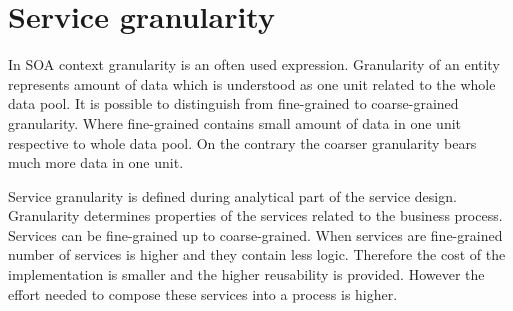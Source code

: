


\bigskip



\section{Service granularity}
\label{sec:granularity}
In SOA context granularity is an often used expression. Granularity of an entity represents amount of data which is understood as one unit related to the whole data pool. It is possible to distinguish from fine-grained to coarse-grained granularity. Where fine-grained contains small amount of data in one unit respective to whole data pool. On the contrary the coarser granularity bears much more data in one unit.

Service granularity is defined during analytical part of the service design. Granularity determines properties of the services related to the business process. Services can be fine-grained up to coarse-grained. When services are fine-grained number of services is higher and they contain less logic. Therefore the cost of the implementation is smaller and the higher reusability is provided. However the effort needed to compose these services into a process is higher. 

